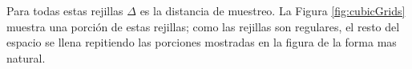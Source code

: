 Para todas estas rejillas $\Delta$ es la distancia de muestreo. La Figura \ref{fig:cubicGrids} muestra una porción de estas rejillas; como las rejillas son regulares, el resto del espacio se llena repitiendo las porciones mostradas en la figura de la forma mas natural.

\begin{figure}[htp]
  \begin{center}

\end{center}
\end{figure}
